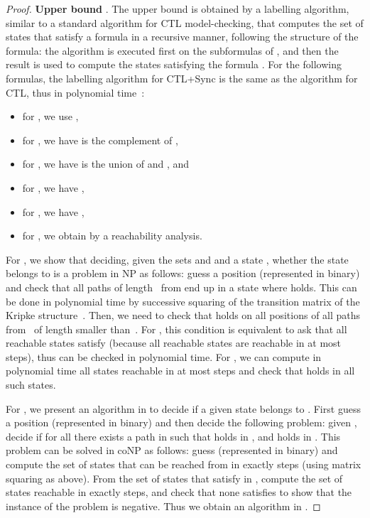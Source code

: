 \documentclass{article}
\begin{document}
\begin{proof}
{\bf Upper bound }. 
The upper bound is obtained by a labelling algorithm, similar to a standard
algorithm for CTL model-checking, that computes the set  
of states that satisfy a formula  in a recursive manner, following the structure of the formula: 
the algorithm is executed first on the subformulas of , and then the
result is used to compute the states satisfying the formula .
For the following formulas, the labelling algorithm for CTL+Sync is the same as 
the algorithm for CTL, thus in polynomial time~\cite{Schnoebelen02}:
\begin{itemize}
\item for , we use  , 
\item for , we have  is the complement of , 
\item for , we have  is the union of  and , and
\item for , we have ,
\item for , we have ,
\item for , we obtain  by a reachability analysis. 
\end{itemize}


For , we show that
deciding, given the sets  and  and a state , 
whether the state  belongs to  is a problem in NP 
as follows: guess a position  (represented in binary) 
and check that all paths of length~ from  end up in a state where  holds. This can be done in polynomial time by successive squaring of the transition
matrix of the Kripke structure~\cite[Theorem 6.1]{SM73}. 
Then, we need to check that  holds on all positions of all paths 
from~ of length smaller than~.
For , this condition is equivalent to ask that all reachable states 
satisfy  (because all reachable states are reachable in at most  steps), 
thus can be checked in polynomial time. 
For , we can compute in polynomial time all states reachable 
in at most  steps and check that  holds in all such states. 

For , we present an algorithm in 
 to decide if a given state  belongs to .
First guess a position  (represented in binary) and 
then decide the following problem: given , decide if 
for all  there exists a path  in  such that 
 holds in , and  holds in . This problem
can be solved in coNP as follows: guess  (represented in binary) 
and compute the set  of states that can be reached from  in exactly  steps
(using matrix squaring as above). From the set   of states that satisfy  in , compute the set of states reachable
in exactly  steps, and check that none satisfies  to show that
the instance of the problem is negative. Thus we obtain an algorithm in
. 


\end{proof}
\end{document}
